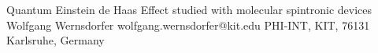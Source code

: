 \begin{conf-abstract}[]
{Quantum Einstein de Haas Effect studied with molecular spintronic devices}
{\color{blue} Wolfgang Wernsdorfer}
{wolfgang.wernsdorfer@kit.edu}
{PHI-INT, KIT, 76131 Karlsruhe, Germany}
{\decofourleft \decofourright}





\printbibliography[heading=none]

\end{conf-abstract}

